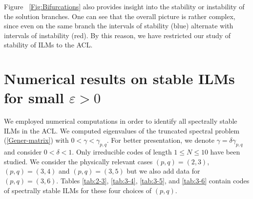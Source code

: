 \documentclass[12pt,reqno]{amsart}
\begin{document}
Figure ~\ref{Fig:Bifurcations}  also provides insight into the stability or instability of the solution branches. One can see that the overall picture is rather complex, since even on the same branch the intervals of stability (blue) alternate with intervals of instability (red).  By this reason, we have restricted our study of stability of ILMs to the ACL.


\section{Numerical results on stable ILMs for small $\varepsilon > 0$}
\label{Sect:Total}

We employed numerical computations in order to identify all spectrally stable ILMs in the ACL. We computed eigenvalues of the truncated spectral problem 
(\ref{Gener-matrix}) with $0<\gamma<\gamma_{{p,q}}$. For better presentation, we denote $\gamma = \delta \gamma_{{p,q}}$ and consider $0<\delta<1$. Only irreducible codes of length $1 \leq N \leq 10$ have been studied. We consider the physically relevant cases $(p,q)=(2,3)$,  $(p,q)=(3,4)$ and $(p,q)=(3,5)$ but we also add data for $(p,q) = (3,6)$. Tables \ref{tab:2-3}, \ref{tab:3-4}, \ref{tab:3-5}, and \ref{tab:3-6} contain codes of spectrally stable ILMs for these four choices of $(p,q)$.
\end{document}
